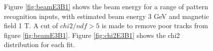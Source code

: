 \begin{figure}[H]
\caption{ Figure \ref{fig:beamE3B1} shows the beam energy for a range of pattern recognition inputs, with estimated beam energy 3 GeV and magnetic field 1 T. A cut of  $chi2/ndf > 5$ is made to remove poor tracks from figure \ref{fig:beamE3B1}. Figure \ref{fig:chi2E3B1} shows the chi2 distribution for each fit.}
\label{fig:energy1}
\end{figure}


